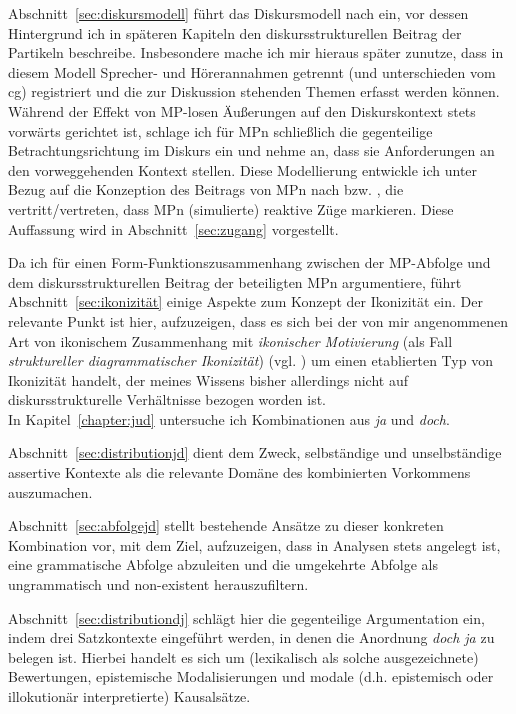 Abschnitt~\ref{sec:diskursmodell} führt das Diskursmodell nach \citet{Farkas2010} ein, vor dessen Hintergrund ich in späteren Kapiteln den diskursstrukturellen Beitrag der Partikeln beschreibe. Insbesondere mache ich mir hieraus später zunutze, dass in diesem Modell Sprecher- und Hörerannahmen getrennt (und unterschieden vom cg) registriert und die zur Diskussion stehenden Themen erfasst werden können. Während der Effekt von MP-losen Äußerungen auf den Diskurskontext stets vorwärts gerichtet ist, schlage ich für MPn schließlich die gegenteilige Betrachtungsrichtung im Diskurs ein und nehme an, dass sie Anforderungen an den vorweggehenden Kontext stellen. Diese Modellierung entwickle ich unter Bezug auf die Konzeption des Beitrags von MPn nach \citet{Diewald2006, Diewald2007} bzw. \citet{Diewald1998}, die vertritt/vertreten, dass MPn (simulierte) reaktive Züge markieren. Diese Auffassung wird in Abschnitt~\ref{sec:zugang} vorgestellt.

Da ich für einen Form-Funktionszusammenhang zwischen der MP-Abfolge und dem diskursstrukturellen Beitrag der beteiligten MPn argumentiere, führt Abschnitt~\ref{sec:ikonizität} einige Aspekte zum Konzept der Ikonizität  ein. Der relevante Punkt ist hier, aufzuzeigen, dass es sich bei der von mir angenommenen Art von ikoni\-schem Zusammenhang mit \textit{ikonischer Motivierung}  (als Fall \textit{struktureller diagrammatischer Ikonizität})  (vgl. \citealt{Haiman1980}) um einen etablierten Typ von Ikonizität handelt, der meines Wissens bisher allerdings nicht auf diskursstrukturelle Verhältnisse bezogen worden ist.\\

\noindent
In Kapitel~\ref{chapter:jud} untersuche ich Kombinationen aus \textit{ja} und \textit{doch}. 

Abschnitt~\ref{sec:distributionjd} dient dem Zweck, selbständige und unselbständige assertive Kontexte als die relevante Domäne des kombinierten Vorkommens auszumachen. 

Abschnitt~\ref{sec:abfolgejd} stellt bestehende Ansätze zu dieser konkreten Kombination vor, mit dem Ziel, aufzuzeigen, dass in Analysen stets angelegt ist, eine grammatische Abfolge abzuleiten und die umgekehrte Abfolge als ungrammatisch und non-existent herauszufiltern. 

Abschnitt~\ref{sec:distributiondj} schlägt hier die gegenteilige Argumentation ein, indem drei Satzkon\-texte eingeführt werden, in denen die Anordnung \textit{doch ja} zu belegen ist. Hierbei handelt es sich um (lexikalisch als solche ausgezeichnete)  Bewertungen, epistemische Modalisierungen  und  modale (d.h. epistemisch oder illokutionär interpretierte) Kausalsätze. 

